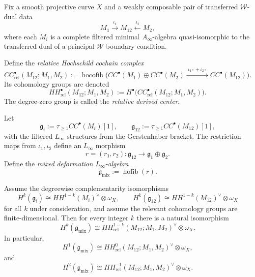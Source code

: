 Fix a smooth projective curve $X$ and a weakly composable pair of transferred $\mathcal{W}$-dual data
\[
M_1 \xrightarrow{\iota_1} M_{12} \xleftarrow{\iota_2} M_2,
\]
where each $M_i$ is a complete filtered minimal $A_\infty$-algebra quasi-isomorphic to the transferred dual of a principal $\mathcal{W}$-boundary condition.

\begin{definition}
\label{def:relative-hochschild-cochains}
Define the \emph{relative Hochschild cochain complex}
\[
CC^\bullet_{\mathrm{rel}}(M_{12};M_1,M_2)
:=
\operatorname{hocofib}\!\Big(
CC^\bullet(M_1)\oplus CC^\bullet(M_2)
\xrightarrow{\;\iota_{1*}+\iota_{2*}\;}
CC^\bullet(M_{12})
\Big).
\]
Its cohomology groups are denoted
\[
HH^\bullet_{\mathrm{rel}}(M_{12};M_1,M_2)
:= H^\bullet\big(CC^\bullet_{\mathrm{rel}}(M_{12};M_1,M_2)\big).
\]
The degree-zero group is called the \emph{relative derived center}.
\end{definition}

\begin{definition}
\label{def:mixed-deformation-linfty-relative}
Let
\[
\mathfrak g_i:=\tau_{\ge 1}CC^\bullet(M_i)[1],
\qquad
\mathfrak g_{12}:=\tau_{\ge 1}CC^\bullet(M_{12})[1],
\]
with the filtered $L_\infty$ structures from the Gerstenhaber bracket. The restriction maps from $\iota_1,\iota_2$ define an $L_\infty$ morphism
\[
r=(r_1,r_2):\mathfrak g_{12}\to \mathfrak g_1\oplus \mathfrak g_2.
\]
Define the \emph{mixed deformation $L_\infty$-algebra}
\[
\mathfrak g_{\mathrm{mix}}:=\operatorname{hofib}(r).
\]
\end{definition}

\begin{theorem}
\label{thm:relative-duality-theorem}
Assume the degreewise complementarity isomorphisms
\[
H^k(\mathfrak g_i)
\cong
HH^{1-k}(M_i)^\vee\otimes \omega_X,
\qquad
H^k(\mathfrak g_{12})
\cong
HH^{1-k}(M_{12})^\vee\otimes \omega_X
\]
for all $k$ under consideration, and assume the relevant cohomology groups are finite-dimensional. Then for every integer $k$ there is a natural isomorphism
\[
H^k(\mathfrak g_{\mathrm{mix}})
\cong
HH^{1-k}_{\mathrm{rel}}(M_{12};M_1,M_2)^\vee\otimes \omega_X.
\]
In particular,
\[
H^1(\mathfrak g_{\mathrm{mix}})
\cong
HH^{0}_{\mathrm{rel}}(M_{12};M_1,M_2)^\vee\otimes \omega_X,
\]
and
\[
H^2(\mathfrak g_{\mathrm{mix}})
\cong
HH^{-1}_{\mathrm{rel}}(M_{12};M_1,M_2)^\vee\otimes \omega_X.
\]
\end{theorem}

